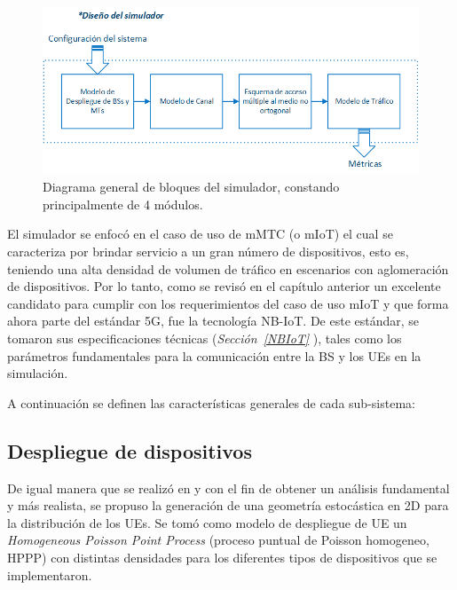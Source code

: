 \begin{figure}[th]
    \centering
    \includegraphics[scale=.9]{Figures/Diagrama general de bloques del simulador}
    \decoRule
    \caption[Diagrama general de bloques del simulador, constando principalmente de 4 módulos.]{Diagrama general de bloques del simulador, constando principalmente de 4 módulos.}
    \label{fig:DiagramaGral}
\end{figure}

El simulador se enfocó en el caso de uso de mMTC (o mIoT) el cual se caracteriza por brindar servicio a un gran número de dispositivos, esto es, teniendo una alta densidad de volumen de tráfico en escenarios con aglomeración de dispositivos. Por lo tanto, como se revisó en el capítulo anterior un excelente candidato para cumplir con los requerimientos del caso de uso mIoT y que forma ahora parte del estándar 5G, fue la tecnología NB-IoT. De este estándar, se tomaron sus especificaciones técnicas (\textit{Sección~\ref{NBIoT} }), tales como los parámetros fundamentales para la comunicación entre la BS y los UEs en la simulación.\newline

A continuación se definen las características generales de cada sub-sistema:

\subsection{Despliegue de dispositivos}

De igual manera que se realizó en \parencite{Kouzayha2018} y \parencite{Zhang2017} con el fin de obtener un análisis fundamental y más realista, se propuso la generación de una geometría estocástica en 2D para la distribución de los UEs. Se tomó como modelo de despliegue de UE un \textit{ Homogeneous Poisson Point Process }(proceso puntual de Poisson homogeneo, HPPP) con distintas densidades para los diferentes tipos de dispositivos que se implementaron.\newline

